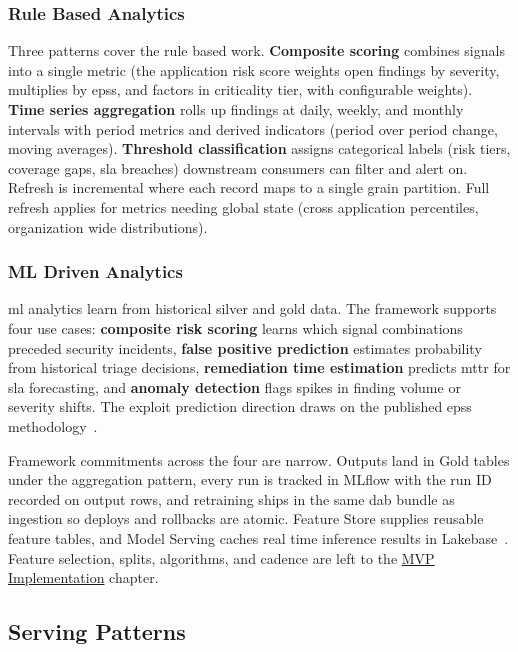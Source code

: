 \subsubsection{Rule Based Analytics}

Three patterns cover the rule based work. \textbf{Composite scoring} combines signals into a single metric (the application risk score weights open findings by severity, multiplies by \gls{epss}, and factors in criticality tier, with configurable weights). \textbf{Time series aggregation} rolls up findings at daily, weekly, and monthly intervals with period metrics and derived indicators (period over period change, moving averages). \textbf{Threshold classification} assigns categorical labels (risk tiers, coverage gaps, \gls{sla} breaches) downstream consumers can filter and alert on. Refresh is incremental where each record maps to a single grain partition. Full refresh applies for metrics needing global state (cross application percentiles, organization wide distributions).

\subsubsection{ML Driven Analytics}

\Gls{ml} analytics learn from historical silver and gold data. The framework supports four use cases: \textbf{composite risk scoring} learns which signal combinations preceded security incidents, \textbf{false positive prediction} estimates probability from historical triage decisions, \textbf{remediation time estimation} predicts \gls{mttr} for \gls{sla} forecasting, and \textbf{anomaly detection} flags spikes in finding volume or severity shifts. The exploit prediction direction draws on the published \gls{epss} methodology~\parencite{Jacobs2020}.

Framework commitments across the four are narrow. Outputs land in Gold tables under the aggregation pattern, every run is tracked in MLflow with the run ID recorded on output rows, and retraining ships in the same \gls{dab} bundle as ingestion so deploys and rollbacks are atomic. Feature Store supplies reusable feature tables, and Model Serving caches real time inference results in Lakebase~\cite{MLflow2025,DatabricksFeatureEng2025}. Feature selection, splits, algorithms, and cadence are left to the \hyperref[ch:implementation]{MVP Implementation} chapter.


\subsection{Serving Patterns}
\label{sec:serving-patterns}

